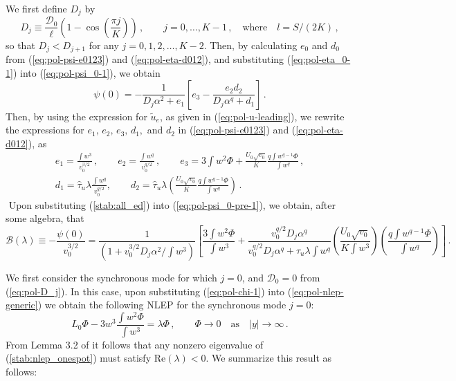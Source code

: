 \documentclass{article}%
\newcommand{\bsub}{\begin{subequations}}
\newcommand{\esub}{\end{subequations}$\!$}
\begin{document}
We first define $D_{j}$ by
\begin{equation}
D_{j}\equiv\frac{{\mathcal D}_{0}}{\ell}
 \left( 1-\cos\left( \frac{\pi j}{K}\right)\right)\,, \qquad
 j=0,\ldots,K-1 \,, \quad \mbox{where}  \quad l={S/(2K)} \,, \label{eq:pol-D_j}
\end{equation}
so that $D_{j}<D_{j+1}$ for any $j=0,1,2,\ldots,K-2$. Then, by calculating
$e_0$ and $d_0$ from (\ref{eq:pol-psi-e0123}) and
(\ref{eq:pol-eta-d012}), and substituting (\ref{eq:pol-eta_0-1}) into
(\ref{eq:pol-psi_0-1}), we obtain
\begin{equation}
\psi(0)  =  -\frac{1}{D_{j}\alpha^2 +e_{1}}\left[e_{3}-
\frac{e_{2}d_{2}}{D_{j}\alpha^q+d_{1}} \right]\,. \label{eq:pol-psi_0-pre-1}
\end{equation}
Then, by using the expression for $\tilde{u}_{e}$, as given
in (\ref{eq:pol-u-leading}), we rewrite the expressions for
$e_{1},\, e_{2},\, e_{3},\, d_{1},$ and $d_{2}$ in
(\ref{eq:pol-psi-e0123}) and (\ref{eq:pol-eta-d012}), as
\bsub \label{stab:all_ed}
\begin{gather}
e_{1}=\frac{\int w^{3}}{v_{0}^{3/2}}\,,\qquad
 e_{2}=\frac{\int w^{q}}{v_{0}^{q/2}}\,,\qquad
e_{3}=3\int w^{2}\Phi+\frac{U_{0}\sqrt{v_{0}}}{K}\frac{q \int w^{q-1}\Phi}
{\int w^{q}} \,, \\
d_{1}=\hat{\tau}_{u}\lambda\frac{\int w^{q}}{v_{0}^{q/2}},\qquad
 d_{2}=\hat{\tau}_{u}\lambda\left(\frac{U_{0}\sqrt{v_{0}}}{K}
\frac{q\int w^{q-1}\Phi}{\int w^{q}}\right)\,.
\end{gather}
\esub
Upon substituting (\ref{stab:all_ed}) into (\ref{eq:pol-psi_0-pre-1}), we
obtain, after some algebra, that
\begin{equation}
 {\mathcal B}(\lambda) \equiv -\frac{\psi(0)}{v_{0}^{3/2}}=
\frac{1}{\left(1+{v_{0}^{3/2}D_{j}\alpha^2/\int w^{3}}
\right)}\left[\frac{3\int w^{2}\Phi}{\int w^{3}}+
 \frac{v_{0}^{q/2}D_{j}\alpha^q}{v_{0}^{q/2}D_{j}\alpha^q +
 \hat{\tau}_u \lambda \int w^q }\left(\frac{U_{0}\sqrt{v_{0}}}
{K\int w^{3}}\right) \left(\frac{q\int w^{q-1}\Phi}{\int w^{q}}\right)\right]\,. 
\label{eq:pol-chi-1}
\end{equation}

We first consider the synchronous mode for which $j=0$, and ${\mathcal
  D}_0=0$ from (\ref{eq:pol-D_j}). In this case, upon substituting
(\ref{eq:pol-chi-1}) into (\ref{eq:pol-nlep-generic}) we obtain the
following NLEP for the synchronous mode $j=0$:
\begin{equation}\label{stab:nlep_onespot}
L_{0}\Phi-3w^{3}\frac{\int w^{2}\Phi}{\int w^{3}}=\lambda\Phi\,, \qquad
\Phi \to 0 \quad \mbox{as} \quad |y|\to \infty \,.
\end{equation}
From Lemma 3.2 of \cite{kww_crime} it follows that any nonzero
eigenvalue of (\ref{stab:nlep_onespot}) must satisfy
$\mbox{Re}(\lambda)<0$. We summarize this result as follows:
\end{document}
